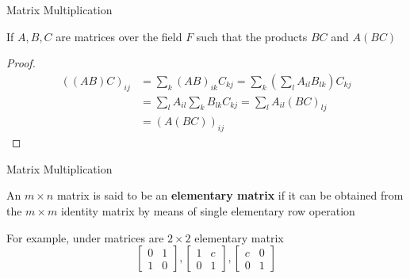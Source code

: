 \documentclass[8pt]{beamer}
\newcommand{\tb}[1]{\textbf{#1}}
\begin{document}
\begin{frame}{Matrix Multiplication}
  \begin{theorem}
    If $A,B,C$ are matrices over the field $F$ such that the products $BC$ and $A(BC)$
  \end{theorem}
  \begin{proof}
    \[
      \begin{aligned}
        ((AB)C)_{ij} &= \sum_{k} (AB)_{ik} C_{kj} = \sum_k \left(\sum_l A_{il} B_{lk}\right) C_{kj} \\
        &= \sum_l A_{il }\sum_k B_{lk} C_{kj} = \sum_l A_{il} (BC)_{lj} \\
        &= (A(BC))_{ij}
      \end{aligned}
    \]
  \end{proof}
\end{frame}

\begin{frame}{Matrix Multiplication}
  \begin{definition}
    An $m \times n$ matrix is said to be an \tb{elementary matrix} if it can be obtained from the $m \times m$ identity matrix by means of single elementary row operation
  \end{definition}

  For example, under matrices are $2\times 2$ elementary matrix
  \[  
  \left[\begin{matrix} 0 & 1 \\ 1 & 0\end{matrix} \right],   \left[\begin{matrix} 1 & c \\ 0 & 1\end{matrix} \right],   \left[\begin{matrix} c & 0 \\ 0 & 1\end{matrix} \right]
  \]

\end{frame}
\end{document}
